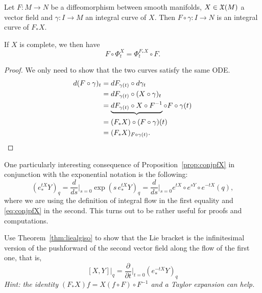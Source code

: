 \begin{proposition}\label{prop:conjpfX}
  Let $F: M \to N$ be a diffeomorphism between smooth manifolds, $X\in\mathfrak{X}(M)$ a vector field and $\gamma:I\to M$ an integral curve of $X$. Then $F\circ\gamma : I \to N$ is an integral curve of $F_* X$.

  If $X$ is complete, we then have
  \begin{equation}
    F\circ\Phi_t^X = \Phi_t^{F_* X}\circ F.
  \end{equation}
\end{proposition}
\begin{proof}
  We only need to show that the two curves satisfy the same ODE.
  \begin{align*}
    d(F\circ \gamma)_t 
    &= dF_{\gamma(t)} \circ d\gamma_t \\
    &= dF_{\gamma(t)} \circ (X \circ \gamma)_t \\
    &= \LaTeXunderbrace{dF_{\gamma(t)} \circ X \circ F^{-1}} \circ F \circ \gamma(t) \\
    &= (F_* X) \circ (F\circ \gamma)(t) \\
    &= (F_* X)_{F\circ\gamma(t)}.
  \end{align*}
\end{proof}

\begin{remark}
  One particularly interesting consequence of Proposition~\ref{prop:conjpfX} in conjunction with the exponential notation is the following:
  \begin{equation}\label{eq:expdiff}
    \left(e_*^{tX} Y\right)_q =
    \frac{d}{ds}\Big|_{s=0} \exp\left(s\, e_*^{tX} Y\right)_q =
    \frac{d}{ds}\Big|_{s=0} e^{tX}\circ e^{sY}\circ e^{-t X}(q),
  \end{equation}
  where we are using the definition of integral flow in the first equality and \eqref{eq:conjpfX} in the second.
  This turns out to be rather useful for proofs and computations.  
\end{remark}

\begin{exercise}
  Use Theorem~\ref{thm:liealgiso} to show that the Lie bracket is the infinitesimal version of the pushforward of the second vector field along the flow of the first one, that is,
  \begin{equation}\label{def:liebracketsecondversion}
    [X,Y]\big|_q = \frac{\partial}{\partial t}\Big|_{t=0} (e_*^{-t X} Y)_q
  \end{equation}
 \textit{\small Hint: the identity $(F_* X)f = X(f\circ F)\circ F^{-1}$ and a Taylor expansion can help.}
\end{exercise}

